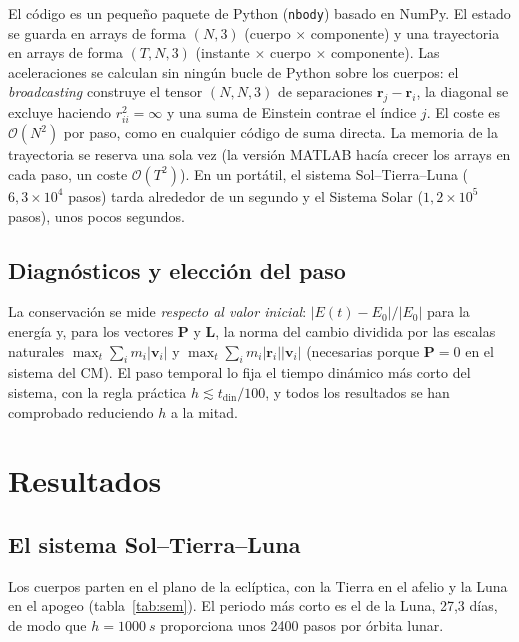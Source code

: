 \documentclass[11pt,a4paper]{article}
\newcommand{\vect}[1]{\mathbf{#1}}
\begin{document}
El código es un pequeño paquete de Python (\texttt{nbody}) basado en NumPy. El estado se
guarda en arrays de forma $(N,3)$ (cuerpo $\times$ componente) y una trayectoria en arrays
de forma $(T,N,3)$ (instante $\times$ cuerpo $\times$ componente). Las aceleraciones se
calculan sin ningún bucle de Python sobre los cuerpos: el \emph{broadcasting} construye el
tensor $(N,N,3)$ de separaciones $\vect r_j-\vect r_i$, la diagonal se excluye haciendo
$r_{ii}^2=\infty$ y una suma de Einstein contrae el índice $j$. El coste es
$\mathcal O(N^2)$ por paso, como en cualquier código de suma directa. La memoria de la
trayectoria se reserva una sola vez (la versión MATLAB hacía crecer los arrays en cada paso,
un coste $\mathcal O(T^2)$). En un portátil, el sistema Sol--Tierra--Luna
($6{,}3\times10^4$ pasos) tarda alrededor de un segundo y el Sistema Solar
($1{,}2\times10^5$ pasos), unos pocos segundos.

\subsection{Diagnósticos y elección del paso}

La conservación se mide \emph{respecto al valor inicial}: $|E(t)-E_0|/|E_0|$ para la
energía y, para los vectores $\vect P$ y $\vect L$, la norma del cambio dividida por las
escalas naturales $\max_t\sum_i m_i|\vect v_i|$ y $\max_t\sum_i m_i|\vect r_i||\vect v_i|$
(necesarias porque $\vect P=0$ en el sistema del CM). El paso temporal lo fija el tiempo
dinámico más corto del sistema, con la regla práctica $h\lesssim t_\text{din}/100$, y todos
los resultados se han comprobado reduciendo $h$ a la mitad.

\section{Resultados}\label{sec:results}

\subsection{El sistema Sol--Tierra--Luna}

Los cuerpos parten en el plano de la eclíptica, con la Tierra en el afelio y la Luna en el
apogeo (tabla~\ref{tab:sem}). El periodo más corto es el de la Luna, 27,3 días, de modo que
$h=\SI{1000}{s}$ proporciona unos 2400 pasos por órbita lunar.
\end{document}
